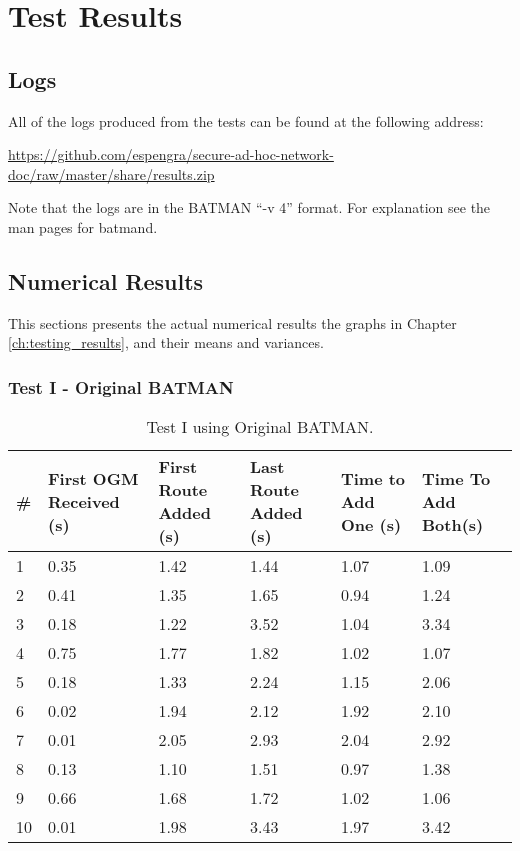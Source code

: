 \chapter{Test Results}
\label{appendix:test_results}
\acresetall

\section{Logs}
All of the logs produced from the tests can be found at the following address:

\url{https://github.com/espengra/secure-ad-hoc-network-doc/raw/master/share/results.zip}

Note that the logs are in the BATMAN ``-v 4'' format. For explanation see the
man pages for batmand.

\section{Numerical Results}
This sections presents the actual numerical results the graphs in Chapter
\ref{ch:testing_results}, and their means and variances.

\subsection{Test I - Original BATMAN}
\begin{table}[h]
	\centering
	\begin{tabular}{| l || p{24mm} || p{22mm} | p{22mm} || p{20mm} |  p{20mm} |}\hline
 		\textbf{\#} & \textbf{First OGM Received (s)} & \textbf{First Route Added (s)} & \textbf{Last Route Added (s)} & \textbf{Time to Add One (s)} & \textbf{Time To Add Both(s)}\\\hline
 		 1 & 0.35 & 1.42 & 1.44 & 1.07 & 1.09\\\hline
 		 2 & 0.41 & 1.35 & 1.65 & 0.94 & 1.24\\\hline
 		 3 & 0.18 & 1.22 & 3.52 & 1.04 & 3.34\\\hline
 		 4 & 0.75 & 1.77 & 1.82 & 1.02 & 1.07\\\hline
 		 5 & 0.18 & 1.33 & 2.24 & 1.15 & 2.06\\\hline
 		 6 & 0.02 & 1.94 & 2.12 & 1.92 & 2.10\\\hline
 		 7 & 0.01 & 2.05 & 2.93 & 2.04 & 2.92\\\hline
 		 8 & 0.13 & 1.10 & 1.51 & 0.97 & 1.38\\\hline
 		 9 & 0.66 & 1.68 & 1.72 & 1.02 & 1.06\\\hline
 		10 & 0.01 & 1.98 & 3.43 & 1.97 & 3.42\\\hline  
	\end{tabular}
	\caption{Test I using Original BATMAN.}
	\label{tab:test1_original}
\end{table}

